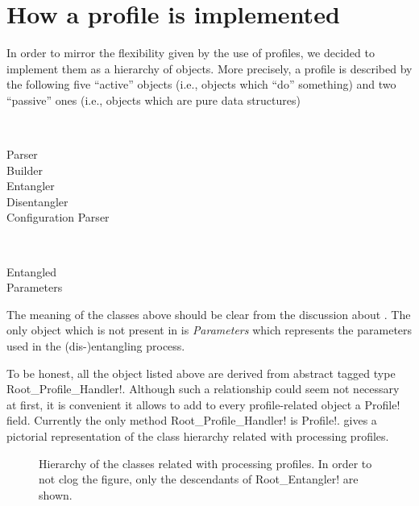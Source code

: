 \documentclass[a4paper]{medusabook}
\begin{document}
\section{How a profile is implemented}
\label{sect:0.3;overview}

In order to mirror the flexibility given by the use of profiles, we
decided to implement them as a hierarchy of objects.  More precisely,
a profile is described by the following five ``active'' objects (i.e.,
objects which ``do'' something) and two ``passive'' ones (i.e.,
objects which are pure data structures)

\begin{description}
\label{description:0.3.0;overview}
\item[Active]~
  \begin{description}
    \item[Parser]
    \item[Builder]
    \item[Entangler]
    \item[Disentangler]
    \item[Configuration Parser]
  \end{description}
\item[Passive]~
  \begin{description}
    \item[Entangled]
    \item[Parameters]
  \end{description}
\end{description}
%
\begin{commento}
  The meaning of the classes above should be clear from the discussion
about .  The only object which is not present in
 is \emph{Parameters} which represents the parameters
used in the (dis-)entangling process.
\end{commento}
%
\begin{commento}
  To be honest, all the object listed above are derived from abstract
  tagged type \ttt Root_Profile_Handler!.  Although such a
  relationship could seem not necessary at first, it is convenient it
  allows to add to every profile-related object a \ttt Profile! field.
  Currently the only method \ttt Root_Profile_Handler! is \ttt
  Profile!.  gives a pictorial representation of the
  class hierarchy related with processing profiles.
\end{commento}
%
\begin{figure}
\centerline{}
\caption{Hierarchy of the classes related with processing profiles.
  In order to not clog the figure, only the descendants of
  \protect\ttt Root\_Entangler! are shown.
\label{fig:classes}}
\end{figure}
\end{document}
